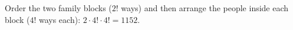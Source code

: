 Order the two family blocks ($2!$ ways) and then arrange the people inside each block ($4!$ ways each): $2\cdot4!\cdot4!=\boxed{1152}$.
